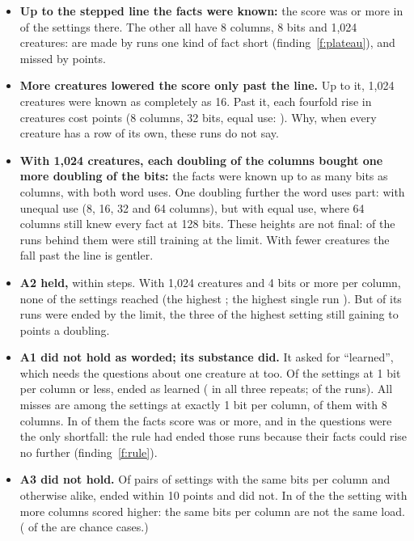 \documentclass[10pt,letterpaper]{article}
\newcounter{finding}
\newcommand{\lead}[1]{\textbf{#1}}               %
\begin{document}
\begin{itemize}
\item \lead{Up to the stepped line the facts were known:} the score was \LearnedBar{} or more in
      \AOneFactsKnown{} of the \AOneCases{} settings there. The other \AOneFactsShort{} all have 8 columns, 8
      bits and 1,024 creatures: \AOneShortByKind{} are made by runs one kind of fact short
      (finding~\ref{f:plateau}), and \AOneShortOthers{} missed \LearnedBar{} by \AOneShortOthersBy{} points.
\item \lead{More creatures lowered the score only past the line.} Up to it, 1,024 creatures were known as
      completely as 16. Past it, each fourfold rise in creatures cost points (8 columns, 32 bits, equal use:
      \CreaturesExample). Why, when every creature has a row of its own, these runs do not say.
\item \lead{With 1,024 creatures, each doubling of the columns bought one more doubling of the bits:} the facts
      were known up to as many bits as columns, with both word uses. One doubling further the word uses part:
      \SameLoadUnequal{} with unequal use (8, 16, 32 and 64 columns), but \SameLoadEqual{} with equal use,
      where 64 columns still knew every fact at 128 bits. These heights are not final: \SameLoadRunsLimit{} of
      the \SameLoadRuns{} runs behind them were still training at the limit. With fewer creatures the fall past
      the line is gentler.
\item \lead{A2 held,} within \Limit{} steps. With 1,024 creatures and 4 bits or more per column, none of the
      \ATwoCases{} settings reached \ATwoBar{} (the highest \ATwoHighest; the highest single run
      \ATwoHighestRun). But \ATwoRunsLimit{} of its \ATwoRuns{} runs were ended by the limit, the three of the
      highest setting still gaining \ATwoTopGainLow{} to \ATwoTopGainHigh{} points a doubling.
\item \lead{A1 did not hold as worded; its substance did.} It asked for ``learned'', which needs the questions
      about one creature at \LearnedBar{} too. Of the \AOneCases{} settings at 1 bit per column or less,
      \AOneLearned{} ended as learned (\AOneAllThree{} in all three repeats; \AOneRunsLearned{} of the
      \AOneRuns{} runs). All \AOneMissed{} misses are among the \AOneAtOne{} settings at exactly 1 bit per
      column, \AOneMissedEight{} of them with 8 columns. In \AOneQuestionsShort{} of them
      the facts score was \LearnedBar{} or more, and in \AOneQuestionsOnly{} the questions were the only
      shortfall: the rule had ended those runs because their facts could rise no further
      (finding~\ref{f:rule}).
\item \lead{A3 did not hold.} Of \AThreeCases{} pairs of settings with the same bits per column and otherwise
      alike, \AThreeWithin{} ended within 10 points and \AThreeApart{} did not. In \AThreeMoreHigher{} of the
      \AThreeApart{} the setting with more columns scored higher: the same bits per column are not the same
      load. (\AThreeByChanceCap{} of the \AThreeApart{} are chance cases.)
\end{itemize}
\end{document}

